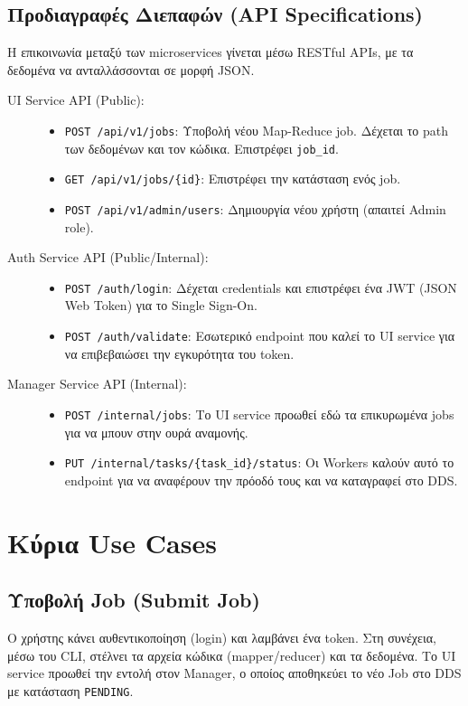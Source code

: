 \documentclass[11pt, a4paper]{article}
\begin{document}
\subsection{Προδιαγραφές Διεπαφών (API Specifications)}
Η επικοινωνία μεταξύ των microservices γίνεται μέσω RESTful APIs, με τα δεδομένα να ανταλλάσσονται σε μορφή JSON.
\begin{description}
    \item[UI Service API (Public):] \hfill
    \begin{itemize}
        \item \texttt{POST /api/v1/jobs}: Υποβολή νέου Map-Reduce job. Δέχεται το path των δεδομένων και τον κώδικα. Επιστρέφει \texttt{job\_id}.
        \item \texttt{GET /api/v1/jobs/\{id\}}: Επιστρέφει την κατάσταση ενός job.
        \item \texttt{POST /api/v1/admin/users}: Δημιουργία νέου χρήστη (απαιτεί Admin role).
    \end{itemize} 

    \item[Auth Service API (Public/Internal):] \hfill
    \begin{itemize}
        \item \texttt{POST /auth/login}: Δέχεται credentials και επιστρέφει ένα JWT (JSON Web Token) για το Single Sign-On.
        \item \texttt{POST /auth/validate}: Εσωτερικό endpoint που καλεί το UI service για να επιβεβαιώσει την εγκυρότητα του token.
    \end{itemize} 
    
    \item[Manager Service API (Internal):] \hfill
    \begin{itemize}
        \item \texttt{POST /internal/jobs}: Το UI service προωθεί εδώ τα επικυρωμένα jobs για να μπουν στην ουρά αναμονής.
        \item \texttt{PUT /internal/tasks/\{task\_id\}/status}: Οι Workers καλούν αυτό το endpoint για να αναφέρουν την πρόοδό τους και να καταγραφεί στο DDS.
    \end{itemize}
\end{description}

\section{Κύρια Use Cases}

\subsection{Υποβολή Job (Submit Job)}
Ο χρήστης κάνει αυθεντικοποίηση (login) και λαμβάνει ένα token. Στη συνέχεια, μέσω του CLI, στέλνει τα αρχεία κώδικα (mapper/reducer) και τα δεδομένα. Το UI service προωθεί την εντολή στον Manager, ο οποίος αποθηκεύει το νέο Job στο DDS με κατάσταση \texttt{PENDING}.
\end{document}
